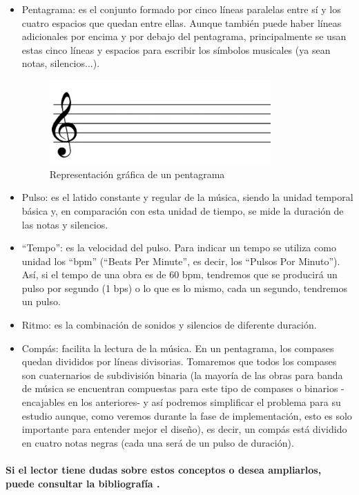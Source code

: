 \begin{itemize}
\item Pentagrama: es el conjunto formado por cinco líneas paralelas entre sí y los cuatro espacios que quedan entre ellas. Aunque también puede haber líneas adicionales por encima y por debajo del pentagrama, principalmente se usan estas cinco líneas y espacios para escribir los símbolos musicales (ya sean notas, silencios...).
  \begin{figure}[htb]
  \centering
  \includegraphics[width=0.8\textwidth]{./imagenes/pentagrama}
  \caption{Representación gráfica de un pentagrama} \label{fig:pentagrama}
  \end{figure}
\item Pulso: es el latido constante y regular de la música, siendo la unidad temporal básica y, en comparación con esta unidad de tiempo, se mide la duración de las notas y silencios.
\item “Tempo”: es la velocidad del pulso. Para indicar un tempo se utiliza como unidad los “bpm” (“Beats Per Minute”, es decir, los “Pulsos Por Minuto”). Así, si el tempo de una obra es de 60 bpm, tendremos que se producirá un pulso por segundo (1 bps) o lo que es lo mismo, cada un segundo, tendremos un pulso.
\item Ritmo: es la combinación de sonidos y silencios de diferente duración.
\item Compás: facilita la lectura de la música. En un pentagrama, los compases quedan divididos por líneas divisorias. Tomaremos que todos los compases son cuaternarios de subdivisión binaria (la mayoría de las obras para banda de música se encuentran compuestas para este tipo de compases o binarios -encajables en los anteriores- y así podremos simplificar el problema para su estudio aunque, como veremos durante la fase de implementación, esto es solo importante para entender mejor el diseño), es decir, un compás está dividido en cuatro notas negras (cada una será de un pulso de duración).
\end{itemize}

\paragraph{
Si el lector tiene dudas sobre estos conceptos o desea ampliarlos, puede consultar la bibliografía \cite{teorMusica} \cite{lenguajeMusical}.
}

